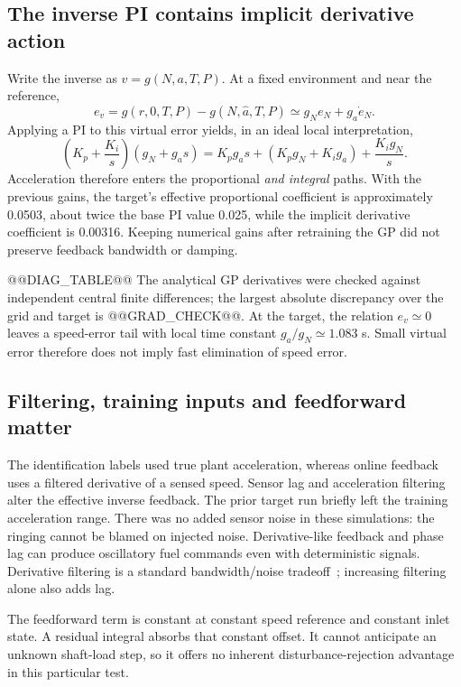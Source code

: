 \subsection{The inverse PI contains implicit derivative action}
Write the inverse as $v=g(N,a,T,P)$. At a fixed environment and near the reference,
\begin{equation}
e_v=g(r,0,T,P)-g(N,\hat a,T,P)\simeq g_N e_N+g_a\dot e_N.
\end{equation}
Applying a PI to this virtual error yields, in an ideal local interpretation,
\begin{equation}
\left(K_p+\frac{K_i}{s}\right)(g_N+g_as)
=K_pg_as+(K_pg_N+K_ig_a)+\frac{K_ig_N}{s}.
\end{equation}
Acceleration therefore enters the proportional \emph{and integral} paths. With the previous gains, the target's effective proportional coefficient is approximately 0.0503, about twice the base PI value 0.025, while the implicit derivative coefficient is 0.00316. Keeping numerical gains after retraining the GP did not preserve feedback bandwidth or damping.

@@DIAG_TABLE@@
The analytical GP derivatives were checked against independent central finite differences; the largest absolute discrepancy over the grid and target is @@GRAD_CHECK@@. At the target, the relation $e_v\simeq0$ leaves a speed-error tail with local time constant $g_a/g_N\simeq1.083$ s. Small virtual error therefore does not imply fast elimination of speed error.

\subsection{Filtering, training inputs and feedforward matter}
The identification labels used true plant acceleration, whereas online feedback uses a filtered derivative of a sensed speed. Sensor lag and acceleration filtering alter the effective inverse feedback. The prior target run briefly left the training acceleration range. There was no added sensor noise in these simulations: the ringing cannot be blamed on injected noise. Derivative-like feedback and phase lag can produce oscillatory fuel commands even with deterministic signals. Derivative filtering is a standard bandwidth/noise tradeoff~\cite{pid}; increasing filtering alone also adds lag.

The feedforward term is constant at constant speed reference and constant inlet state. A residual integral absorbs that constant offset. It cannot anticipate an unknown shaft-load step, so it offers no inherent disturbance-rejection advantage in this particular test.


